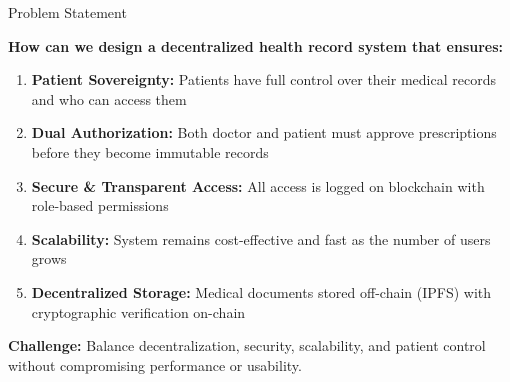 \documentclass[10pt]{beamer}
\begin{document}
\begin{frame}{Problem Statement}
\begin{center}
\textbf{How can we design a decentralized health record system that ensures:}
\end{center}

\vspace{0.5cm}
\begin{enumerate}
\item \textbf{Patient Sovereignty:} Patients have full control over their medical records and who can access them

\item \textbf{Dual Authorization:} Both doctor and patient must approve prescriptions before they become immutable records

\item \textbf{Secure \& Transparent Access:} All access is logged on blockchain with role-based permissions

\item \textbf{Scalability:} System remains cost-effective and fast as the number of users grows

\item \textbf{Decentralized Storage:} Medical documents stored off-chain (IPFS) with cryptographic verification on-chain
\end{enumerate}

\vspace{0.3cm}
\begin{center}
\textbf{Challenge:} Balance decentralization, security, scalability, and patient control without compromising performance or usability.
\end{center}
\end{frame}
\end{document}
